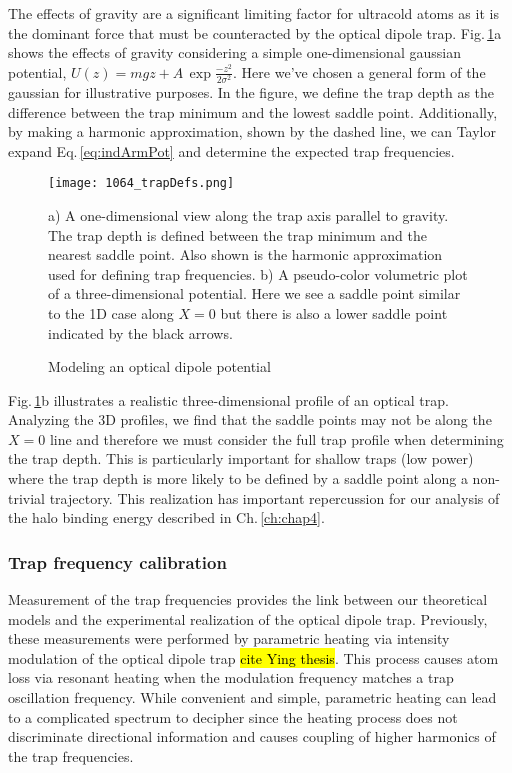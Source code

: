 The effects of gravity are a significant limiting factor for ultracold atoms as it is the dominant force that must be counteracted by the optical dipole trap.
Fig.\,\ref{fig:trapDepth}a shows the effects of gravity considering a simple one-dimensional gaussian potential, $U(z) = mgz + A\,\exp{\frac{-z^2}{2\sigma^2}}$.
Here we've chosen a general form of the gaussian for illustrative purposes.
In the figure, we define the trap depth as the difference between the trap minimum and the lowest saddle point.
Additionally, by making a harmonic approximation, shown by the dashed line, we can Taylor expand Eq.\,\ref{eq:indArmPot} and determine the expected trap frequencies.
	\begin{figure} 
		\centerline{
		\texttt{[image: 1064\_trapDefs.png]}}
		\caption{Modeling an optical dipole potential}{a) A one-dimensional view along the trap axis parallel to gravity. The trap depth is defined between the trap minimum and the nearest saddle point. Also shown is the harmonic approximation used for defining trap frequencies. b) A pseudo-color volumetric plot of a three-dimensional potential. Here we see a saddle point similar to the 1D case along $X=0$ but there is also a lower saddle point indicated by the black arrows.}
		\label{fig:trapDepth}
	\end{figure}
Fig.\,\ref{fig:trapDepth}b illustrates a realistic three-dimensional profile of an optical trap.
Analyzing the 3D profiles, we find that the saddle points may not be along the $X=0$ line and therefore we must consider the full trap profile when determining the trap depth.
This is particularly important for shallow traps (low power) where the trap depth is more likely to be defined by a saddle point along a non-trivial trajectory.
This realization has important repercussion for our analysis of the halo binding energy described in Ch.\,\ref{ch:chap4}.

\subsubsection{Trap frequency calibration} \label{sssec:1064_trap_freq}
Measurement of the trap frequencies provides the link between our theoretical models and the experimental realization of the optical dipole trap.
Previously, these measurements were performed by parametric heating via intensity modulation of the optical dipole trap \hl{cite Ying thesis}. 
This process causes atom loss via resonant heating when the modulation frequency matches a trap oscillation frequency. 
While convenient and simple, parametric heating can lead to a complicated spectrum to decipher since the heating process does not discriminate directional information and causes coupling of higher harmonics of the trap frequencies. 


